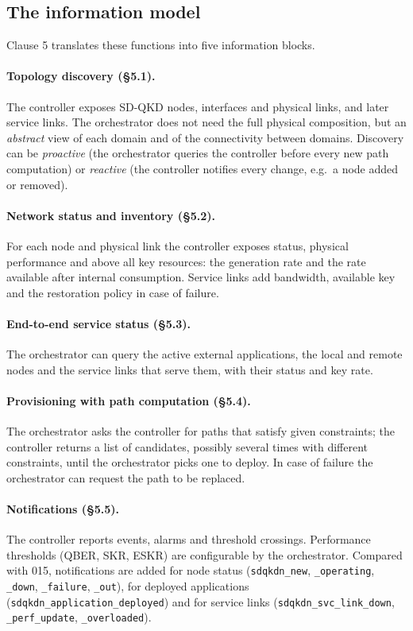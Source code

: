 \subsection{The information model}
\label{sec:infomodel}

Clause 5 translates these functions into five information blocks.

\paragraph{Topology discovery (§5.1).}
The controller exposes SD-QKD nodes, interfaces and physical links, and
later service links. The orchestrator does not need the full physical
composition, but an \emph{abstract} view of each domain and of the
connectivity between domains. Discovery can be \emph{proactive} (the
orchestrator queries the controller before every new path computation) or
\emph{reactive} (the controller notifies every change, e.g.\ a node added
or removed).

\paragraph{Network status and inventory (§5.2).}
For each node and physical link the controller exposes status, physical
performance and above all key resources: the generation rate and the rate
available after internal consumption. Service links add bandwidth,
available key and the restoration policy in case of failure.

\paragraph{End-to-end service status (§5.3).}
The orchestrator can query the active external applications, the local and
remote nodes and the service links that serve them, with their status and
key rate.

\paragraph{Provisioning with path computation (§5.4).}
The orchestrator asks the controller for paths that satisfy given
constraints; the controller returns a list of candidates, possibly several
times with different constraints, until the orchestrator picks one to
deploy. In case of failure the orchestrator can request the path to be
replaced.

\paragraph{Notifications (§5.5).}
The controller reports events, alarms and threshold crossings. Performance
thresholds (QBER, SKR, ESKR) are configurable by the orchestrator. Compared
with 015, notifications are added for node status (\texttt{sdqkdn\_new},
\texttt{\_operating}, \texttt{\_down}, \texttt{\_failure},
\texttt{\_out}), for deployed applications
(\texttt{sdqkdn\_application\_deployed}) and for service links
(\texttt{sdqkdn\_svc\_link\_down}, \texttt{\_perf\_update},
\texttt{\_overloaded}).

